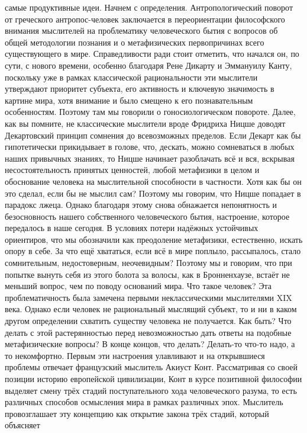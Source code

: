 самые продуктивные идеи. Начнем с определения. Антропологический поворот от
греческого антропос-человек заключается в переориентации философского внимания
мыслителей на проблематику человеческого бытия с вопросов об общей методологии
познания и о метафизических первопричинах всего существующего в мире.
Справедливости ради стоит отметить, что начался он, по сути, с нового времени,
особенно благодаря Рене Дикарту и Эммануилу Канту, поскольку уже в рамках
классической рациональности эти мыслители утверждают приоритет субъекта, его
активность и ключевую значимость в картине мира, хотя внимание и было смещено к
его познавательным особенностям. Поэтому там мы говорили о гоносиологическом
повороте. Далее, как вы помните, не классические мыслители вроде Фридриха Ницше
доводят Декартовский принцип сомнения до всевозможных пределов. Если Декарт как
бы гипотетически прикидывает в голове, что, дескать, можно сомневаться в любых
наших привычных знаниях, то Ницше начинает разоблачать всё и вся, вскрывая
несостоятельность принятых ценностей, любой метафизики в целом и обоснование
человека на мыслительной способности в частности. Хотя как бы он это сделал,
если бы не мыслил сам? Поэтому мы говорим, что Ницше попадает в парадокс лжеца.
Однако благодаря этому снова обнажается непонятность и безосновность нашего
собственного человеческого бытия, настроение, которое передалось в наше сегодня.
В условиях потери надёжных устойчивых ориентиров, что мы обозначили как
преодоление метафизики, естественно, искать опору в себе. За что ещё хвататься,
если всё в мире поплыло, рассыпалось, стало сомнительным, недостоверным,
неочевидным? Поэтому мы и говорим, что при попытке вынуть себя из этого болота
за волосы, как в Бронненхаузе, встаёт не меньший вопрос, чем по поводу оснований
мира. Что такое человек? Эта проблематичность была замечена первыми
неклассическими мыслителями XIX века. Однако если человек не рациональный
мыслящий субъект, то и ни в каком другом определении схватить существу человека
не получается. Как быть? Что делать с этой растерянностью перед невозможностью
дать ответы на подобные метафизические вопросы? В конце концов, что делать?
Делать-то что-то надо, а то некомфортно. Первым эти настроения улавливают и на
открывшиеся проблемы отвечает французский мыслитель Акиуст Конт. Рассматривая со
своей позиции историю европейской цивилизации, Конт в курсе позитивной философии
выделяет смену трёх стадий поступательного хода человеческого разума, то есть
различных способов осмысления мира в рамках различных эпох. Мыслитель
провозглашает эту концепцию как открытие закона трёх стадий, который объясняет
